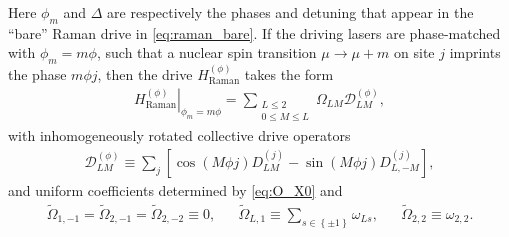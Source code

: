 \documentclass[nofootinbib,notitlepage,11pt]{revtex4-2}
\renewcommand{\t}{\text} %
\newcommand{\p}[1]{\left(#1\right)} %
\renewcommand{\sp}[1]{\left[#1\right]} %
\renewcommand{\set}[1]{\left\{#1\right\}} %
\newcommand{\1}{\mathds{1}}
\newcommand{\D}{\mathcal{D}}
\begin{document}
Here $\phi_m$ and $\Delta$ are respectively the phases and detuning
that appear in the ``bare'' Raman drive in \eqref{eq:raman_bare}.  If
the driving lasers are phase-matched with $\phi_m=m\phi$, such that a
nuclear spin transition $\mu\to\mu+m$ on site $j$ imprints the phase
$m\phi j$, then the drive $H_{\t{Raman}}^{(\phi)}$ takes the form
\begin{align}
  \left. H_{\t{Raman}}^{(\phi)} \right|_{\phi_m=m\phi}
  = \sum_{\substack{L\le2\\0\le M\le L}} \Omega_{LM} \D_{LM}^{(\phi)},
\end{align}
with inhomogeneously rotated collective drive operators
\begin{align}
  \D_{LM}^{(\phi)}
  \equiv \sum_j \sp{\cos\p{M\phi j} D_{LM}^{(j)}
    - \sin\p{M\phi j} D_{L,-M}^{(j)}},
\end{align}
and uniform coefficients determined by \eqref{eq:O_X0} and
\begin{align}
  \tilde\Omega_{1,-1} = \tilde\Omega_{2,-1}
  = \tilde\Omega_{2,-2} \equiv 0,
  &&
  \tilde\Omega_{L,1} \equiv \sum_{s\in\set{\pm1}} \omega_{Ls},
  &&
  \tilde\Omega_{2,2} \equiv \omega_{2,2}.
\end{align}



\end{document}
